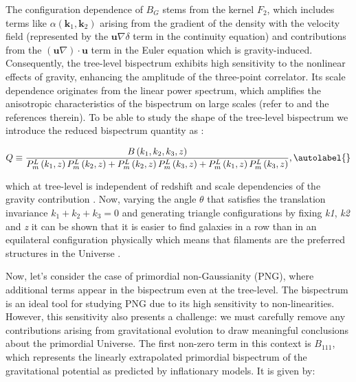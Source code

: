 The configuration dependence of $B_{G}$ stems from the kernel $F_{2}$, which includes terms like $\alpha\left(\mathbf{k}_{1}, \mathbf{k}_{2}\right)$ arising from the gradient of the density with the velocity field (represented by the $\mathbf{u} \nabla \delta$ term in the continuity equation) and contributions from the $(\mathbf{u} \nabla) \cdot \mathbf{u}$ term in the Euler equation which is gravity-induced. Consequently, the tree-level bispectrum exhibits high sensitivity to the nonlinear effects of gravity, enhancing the amplitude of the three-point correlator. Its scale dependence originates from the linear power spectrum, which amplifies the anisotropic characteristics of the bispectrum on large scales (refer to \cite{Liguori:2010hx} and the references therein). To be able to study the shape of the tree-level bispectrum we introduce the reduced bispectrum quantity as \cite{FRY1984ApJ...279..499F}:


\begin{equation}
    Q \equiv \frac{B\left(k_{1}, k_{2}, k_{3}, z\right)}{P_{m}^{L}\left(k_{1}, z\right) P_{m}^{L}\left(k_{2}, z\right)+P_{m}^{L}\left(k_{2}, z\right) P_{m}^{L}\left(k_{3}, z\right)+P_{m}^{L}\left(k_{1}, z\right) P_{m}^{L}\left(k_{3}, z\right)}, \autolabel{}
\end{equation}

which at tree-level is independent of redshift \cite{FRY1984ApJ...279..499F} and scale dependencies of the gravity contribution \cite{FRY1994ApJ...421...21F}. Now, varying the angle $\theta$ that satisfies the translation invariance $k_{1}+k_{2}+k_{3}= 0 $ and generating triangle configurations by fixing \emph{k1}, \emph{k2} and \emph{z} it can be shown that it is easier to find galaxies in a row than in an equilateral configuration physically which means that filaments are the preferred structures in the Universe \cite{Liguori:2010hx}.


Now, let's consider the case of primordial non-Gaussianity (PNG), where additional terms appear in the bispectrum even at the tree-level. The bispectrum is an ideal tool for studying PNG due to its high sensitivity to non-linearities. However, this sensitivity also presents a challenge: we must carefully remove any contributions arising from gravitational evolution to draw meaningful conclusions about the primordial Universe. The first non-zero term in this context is \( B_{111} \), which represents the linearly extrapolated primordial bispectrum of the gravitational potential as predicted by inflationary models. It is given by:


